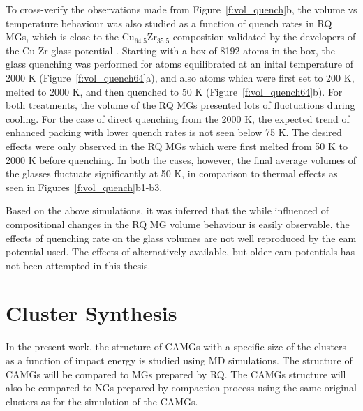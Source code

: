To cross-verify the observations made from Figure~\ref{f:vol_quench}b, the volume vs temperature behaviour was also studied as a function of quench rates in \czsix  RQ MGs, which is close to the Cu$_{64.5}$Zr$_{35.5}$ composition validated by the developers of the Cu-Zr glass potential \cite{Mendelev2019}. Starting with a box of 8192 atoms in the box, the glass quenching was performed for atoms equilibrated at an inital temperature of 2000 K (Figure~\ref{f:vol_quench64}a), and also atoms which were first set to 200 K, melted to 2000 K, and then quenched to 50 K (Figure~\ref{f:vol_quench64}b). For both treatments, the volume of the RQ MGs presented lots of fluctuations during cooling. For the case of direct quenching from the 2000 K, the expected trend of enhanced packing with lower quench rates is not seen below 75 K. The desired effects were only observed in the \czsix RQ MGs which were first melted from 50 K to 2000 K before quenching. In both the cases, however, the final average volumes of the glasses fluctuate significantly at 50 K, in comparison to thermal effects as seen in Figures~\ref{f:vol_quench}b1-b3. \par 

Based on the above simulations, it was inferred that the while influenced of compositional changes in the RQ MG volume behaviour is easily observable, the effects of quenching rate on the glass volumes are not well reproduced by the \gls{eam} potential used. The effects of alternatively available, but older \gls{eam} potentials \cite{Cheng2008,Mendelev2009} has not been attempted in this thesis.

%
\section{Cluster Synthesis} \label{s:clus}

\begin{changebar}
In the present work, the structure of CAMGs with a specific size of the clusters as a function of impact energy is studied using MD simulations. The structure of CAMGs will be compared to MGs prepared by RQ. The CAMGs structure will also be compared to NGs prepared by compaction process using the same original clusters as for the simulation of the CAMGs. \par
\end{changebar}

